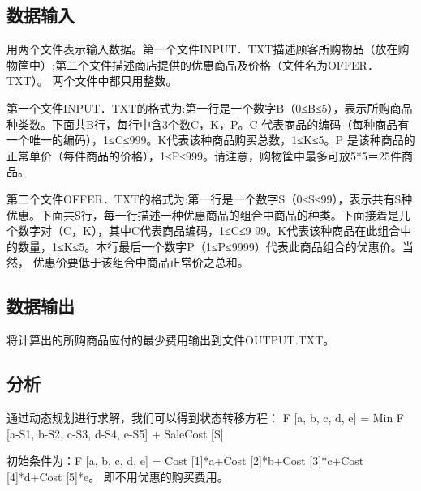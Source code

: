 \documentclass[UTF8]{ctexart}
\begin{document}
    \subsection{数据输入}
    用两个文件表示输入数据。第一个文件INPUT．TXT描述顾客所购物品（放在购物筐中）;第二个文件描述商店提供的优惠商品及价格（文件名为OFFER．TXT）。 两个文件中都只用整数。

    第一个文件INPUT．TXT的格式为:第一行是一个数字B（0≤B≤5），表示所购商品种类数。下面共B行，每行中含3个数C，K，P。C 代表商品的编码（每种商品有一个唯一的编码），1≤C≤999。K代表该种商品购买总数，1≤K≤5。P 是该种商品的正常单价（每件商品的价格），1≤P≤999。请注意，购物筐中最多可放5*5＝25件商品。

    第二个文件OFFER．TXT的格式为:第一行是一个数字S（0≤S≤99），表示共有S种优惠。下面共S行，每一行描述一种优惠商品的组合中商品的种类。下面接着是几个数字对（C，K），其中C代表商品编码，1≤C≤9 99。K代表该种商品在此组合中的数量，1≤K≤5。本行最后一个数字P（1≤P≤9999）代表此商品组合的优惠价。当然， 优惠价要低于该组合中商品正常价之总和。

    \subsection{数据输出}
    将计算出的所购商品应付的最少费用输出到文件OUTPUT.TXT。

    \subsection{分析}
    通过动态规划进行求解，我们可以得到状态转移方程：
    F [a, b, c, d, e] = Min {F [a-S1, b-S2, c-S3, d-S4, e-S5] + SaleCost [S]}

    初始条件为：F [a, b, c, d, e] = Cost [1]*a+Cost [2]*b+Cost [3]*c+Cost [4]*d+Cost [5]*e。 即不用优惠的购买费用。
\end{document}
